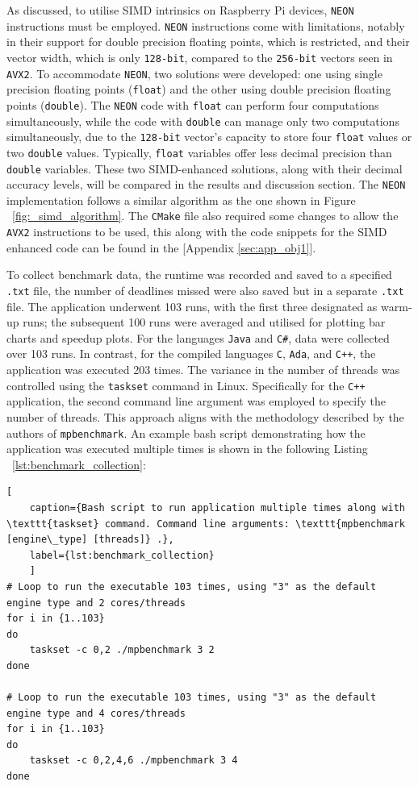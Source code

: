 As discussed, to utilise SIMD intrinsics on Raspberry Pi devices, \texttt{NEON} instructions must be employed. \texttt{NEON} instructions come with limitations, notably in their support for double precision floating points, which is restricted, and their vector width, which is only \texttt{128-bit}, compared to the \texttt{256-bit} vectors seen in \texttt{AVX2}\cite{neon_reference}. To accommodate \texttt{NEON}, two solutions were developed: one using single precision floating points (\texttt{float}) and the other using double precision floating points (\texttt{double}). The \texttt{NEON} code with \texttt{float} can perform four computations simultaneously, while the code with \texttt{double} can manage only two computations simultaneously, due to the \texttt{128-bit} vector's capacity to store four \texttt{float} values or two \texttt{double} values. Typically, \texttt{float} variables offer less decimal precision than \texttt{double} variables. These two SIMD-enhanced solutions, along with their decimal accuracy levels, will be compared in the results and discussion section. The \texttt{NEON} implementation follows a similar algorithm as the one shown in Figure ~\ref{fig:_simd_algorithm}. The \texttt{CMake} file also required some changes to allow the \texttt{AVX2} instructions to be used, this along with the code snippets for the SIMD enhanced code can be found in the [Appendix \ref{sec:app_obj1}]. 

To collect benchmark data, the runtime was recorded and saved to a specified \texttt{.txt} file, the number of deadlines missed were also saved but in a separate \texttt{.txt} file. The application underwent 103 runs, with the first three designated as warm-up runs; the subsequent 100 runs were averaged and utilised for plotting bar charts and speedup plots. For the languages \texttt{Java} and \texttt{C\#}, data were collected over 103 runs. In contrast, for the compiled languages \texttt{C}, \texttt{Ada}, and \texttt{C++}, the application was executed 203 times. The variance in the number of threads was controlled using the \texttt{taskset} command in Linux. Specifically for the \texttt{C++} application, the second command line argument was employed to specify the number of threads. This approach aligns with the methodology described by the authors of \texttt{mpbenchmark}\cite{mpbenchmark_paper}. An example bash script demonstrating how the application was executed multiple times is shown in the following Listing ~\ref{lst:benchmark_collection}:

\begin{lstlisting}[
	caption={Bash script to run application multiple times along with \texttt{taskset} command. Command line arguments: \texttt{mpbenchmark [engine\_type] [threads]} .},
	label={lst:benchmark_collection}
	]
# Loop to run the executable 103 times, using "3" as the default engine type and 2 cores/threads 
for i in {1..103}
do
	taskset -c 0,2 ./mpbenchmark 3 2 
done

# Loop to run the executable 103 times, using "3" as the default engine type and 4 cores/threads 
for i in {1..103}
do
	taskset -c 0,2,4,6 ./mpbenchmark 3 4 
done
\end{lstlisting}

